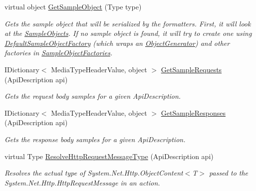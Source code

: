 \begin{DoxyCompactItemize}
virtual object \hyperlink{classApi3Layers_1_1Areas_1_1HelpPage_1_1HelpPageSampleGenerator_af4bca1316988d1e1f24b3eb08072b96a}{Get\+Sample\+Object} (Type type)
\begin{DoxyCompactList}\small\item\em Gets the sample object that will be serialized by the formatters. First, it will look at the \hyperlink{classApi3Layers_1_1Areas_1_1HelpPage_1_1HelpPageSampleGenerator_a74c69a35009188bdaff61af066b34aaa}{Sample\+Objects}. If no sample object is found, it will try to create one using \hyperlink{classApi3Layers_1_1Areas_1_1HelpPage_1_1HelpPageSampleGenerator_ad705006e59bbf735bcf96abbf25219f2}{Default\+Sample\+Object\+Factory} (which wraps an \hyperlink{classApi3Layers_1_1Areas_1_1HelpPage_1_1ObjectGenerator}{Object\+Generator}) and other factories in \hyperlink{classApi3Layers_1_1Areas_1_1HelpPage_1_1HelpPageSampleGenerator_afe79b8cfae9329d64220589984337741}{Sample\+Object\+Factories}. \end{DoxyCompactList}\item 
I\+Dictionary$<$ Media\+Type\+Header\+Value, object $>$ \hyperlink{classApi3Layers_1_1Areas_1_1HelpPage_1_1HelpPageSampleGenerator_a8390b1d96ceaaccb4ee4540b971f51d0}{Get\+Sample\+Requests} (Api\+Description api)
\begin{DoxyCompactList}\small\item\em Gets the request body samples for a given Api\+Description. \end{DoxyCompactList}\item 
I\+Dictionary$<$ Media\+Type\+Header\+Value, object $>$ \hyperlink{classApi3Layers_1_1Areas_1_1HelpPage_1_1HelpPageSampleGenerator_a7e3dba29a03587e41cf2dc04475f266a}{Get\+Sample\+Responses} (Api\+Description api)
\begin{DoxyCompactList}\small\item\em Gets the response body samples for a given Api\+Description. \end{DoxyCompactList}\item 
virtual Type \hyperlink{classApi3Layers_1_1Areas_1_1HelpPage_1_1HelpPageSampleGenerator_a74ffe7b081131a8417acace964c1ea1c}{Resolve\+Http\+Request\+Message\+Type} (Api\+Description api)
\begin{DoxyCompactList}\small\item\em Resolves the actual type of System.\+Net.\+Http.\+Object\+Content$<$\+T$>$ passed to the System.\+Net.\+Http.\+Http\+Request\+Message in an action. \end{DoxyCompactList}\item 

\end{DoxyCompactItemize}
